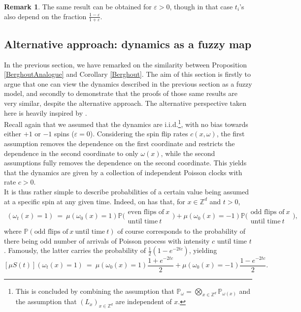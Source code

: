 \documentclass[12pt]{article}
\renewcommand{\P}{\mathbb{P}}
\newcommand{\Z}{\mathbb{Z}}
\newcommand{\1}{\mathbbm{1}}
\newcommand{\5}{\vspace{0.5cm}}
\theoremstyle{definition}
\newtheorem{rem}[thm]{Remark}
\begin{document}
\begin{rem}
The same result can be obtained for $\varepsilon>0$, though in that case $t_i$'s also depend on the fraction $\frac{1-\varepsilon}{1+\varepsilon}$.
\end{rem}


\subsection{Alternative approach: dynamics as a fuzzy map}

In the previous section, we have remarked on the similarity between Proposition \ref{BerghoutAnalogue} and Corollary \ref{Berghout}. The aim of this section is firstly to argue that one can view the dynamics described in the previous section as a fuzzy model, and secondly to demonstrate that the proofs of those same results are very similar, despite the alternative approach. The alternative perspective taken here is heavily inspired by \cite{Ver}. \\

Recall again that we assumed that the dynamics are i.i.d.\footnote{This is concluded by combining the assumption that $\P_\omega=\bigotimes_{x\in\Z^d}\P_{\omega(x)}$ and the assumption that $(L_x)_{x\in\Z^d}$ are independent of $x$.}, with no bias towards either $+1$ or $-1$ spins ($\varepsilon=0$). Considering the spin flip rates $c(x,\omega)$, the first assumption removes the dependence on the first coordinate and restricts the dependence in the second coordinate to only $\omega(x)$, while the second assumptions fully removes the dependence on the second coordinate. This yields that the dynamics are given by a collection of independent Poisson clocks with rate $c>0$. \\

It is thus rather simple to describe probabilities of a certain value being assumed at a specific spin at any given time. Indeed, on has that, for $x\in\Z^d$ and $t>0$,
\begin{align*}
[\mu S(t)](\omega_t(x)=1) ~=~ \mu(\omega_0(x)=1)\P\big(\substack{\text{even flips of}~x\\\text{until time}~t}\big) + \mu(\omega_0(x)=-1)\P\big(\substack{\text{odd flips of}~x\\\text{until time}~t}\big),
\end{align*}
where $\P(\text{odd flips of}~x~\text{until time}~t)$ of course corresponds to the probability of there being odd number of arrivals of Poisson process with intensity $c$ until time $t$. Famously, the latter carries the probability of $\frac{1}{2}(1-e^{-2tc})$, yielding
$$[\mu S(t)](\omega_t(x)=1) ~=~ \mu(\omega_0(x)=1)\frac{1+e^{-2tc}}{2} + \mu(\omega_0(x)=-1)\frac{1-e^{-2tc}}{2}.$$
\end{document}
